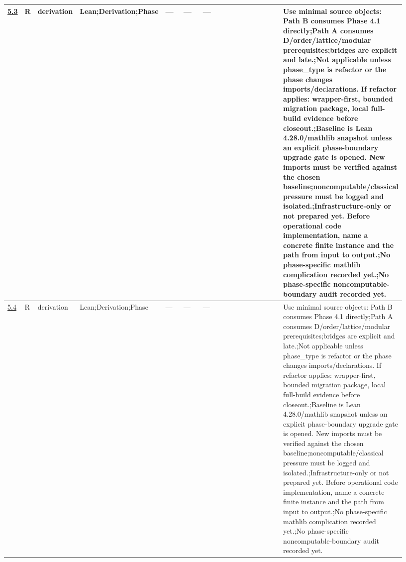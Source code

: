\begin{longtable}{L{0.026\linewidth} L{0.024\linewidth} L{0.045\linewidth} L{0.07\linewidth} L{0.065\linewidth} L{0.075\linewidth} L{0.11\linewidth} L{0.19\linewidth} L{0.155\linewidth} L{0.17\linewidth}}
\hyperlink{phase-row-5-3}{5.3} & R & derivation & Lean;\newline Derivation;\newline Phase & --- & --- & --- &  &  & Use minimal source objects: Path B consumes Phase 4.1 directly;\newline Path A consumes D/\allowbreak{}order/\allowbreak{}lattice/\allowbreak{}modular prerequisites;\newline bridges are explicit and late.;\newline Not applicable unless phase\_type is refactor or the phase changes imports/\allowbreak{}declarations. If refactor applies: wrapper-first, bounded migration package, local full-build evidence before closeout.;\newline Baseline is Lean 4.28.0/\allowbreak{}mathlib snapshot unless an explicit phase-boundary upgrade gate is opened. New imports must be verified against the chosen baseline;\newline noncomputable/\allowbreak{}classical pressure must be logged and isolated.;\newline Infrastructure-only or not prepared yet. Before operational code implementation, name a concrete finite instance and the path from input to output.;\newline No phase-specific mathlib complication recorded yet.;\newline No phase-specific noncomputable-boundary audit recorded yet.\\
\hline
\addlinespace[0.24em]
\hyperlink{phase-row-5-4}{5.4} & R & derivation & Lean;\newline Derivation;\newline Phase & --- & --- & --- &  &  & Use minimal source objects: Path B consumes Phase 4.1 directly;\newline Path A consumes D/\allowbreak{}order/\allowbreak{}lattice/\allowbreak{}modular prerequisites;\newline bridges are explicit and late.;\newline Not applicable unless phase\_type is refactor or the phase changes imports/\allowbreak{}declarations. If refactor applies: wrapper-first, bounded migration package, local full-build evidence before closeout.;\newline Baseline is Lean 4.28.0/\allowbreak{}mathlib snapshot unless an explicit phase-boundary upgrade gate is opened. New imports must be verified against the chosen baseline;\newline noncomputable/\allowbreak{}classical pressure must be logged and isolated.;\newline Infrastructure-only or not prepared yet. Before operational code implementation, name a concrete finite instance and the path from input to output.;\newline No phase-specific mathlib complication recorded yet.;\newline No phase-specific noncomputable-boundary audit recorded yet.\\

\end{longtable}
